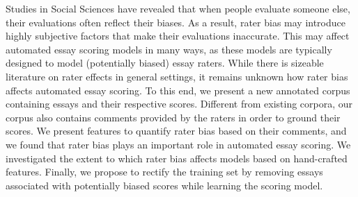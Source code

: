 Studies in Social Sciences have revealed that when people evaluate someone else, their evaluations often reflect their biases. As a result, rater bias may introduce highly subjective factors that make their evaluations inaccurate. This may affect automated essay scoring models in many ways, as these models are typically designed to model (potentially biased) essay raters. While there is sizeable literature on rater effects in general settings, it remains unknown how rater bias affects automated essay scoring. To this end, we present a new annotated corpus containing essays and their respective scores. Different from existing corpora, our corpus also contains comments provided by the raters in order to ground their scores. We present features to quantify rater bias based on their comments, and we found that rater bias plays an important role in automated essay scoring. We investigated the extent to which rater bias affects models based on hand-crafted features. Finally, we propose to rectify the training set by removing essays associated with potentially biased scores while learning the scoring model.
